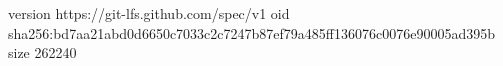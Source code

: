 version https://git-lfs.github.com/spec/v1
oid sha256:bd7aa21abd0d6650c7033c2c7247b87ef79a485ff136076c0076e90005ad395b
size 262240
